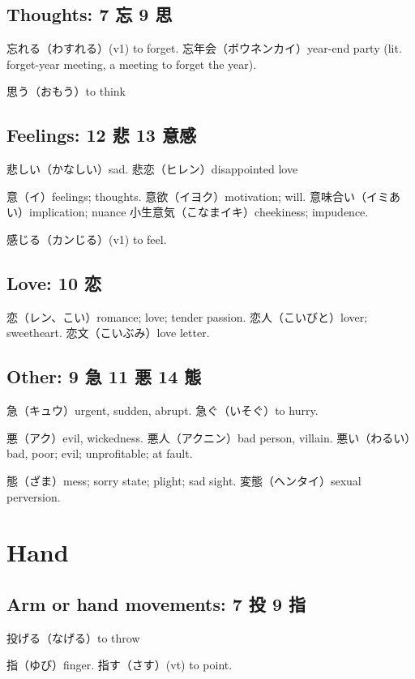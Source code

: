 \subsection{Thoughts: 7 忘 9 思}

忘れる（わすれる）(v1) to forget.
忘年会（ボウネンカイ）year-end party
(lit. forget-year meeting, a meeting to forget the year).

思う（おもう）to think

\subsection{Feelings: 12 悲 13 意感}

悲しい（かなしい）sad.
悲恋（ヒレン）disappointed love

意（イ）feelings; thoughts.
意欲（イヨク）motivation; will.
意味合い（イミあい）implication; nuance
小生意気（こなまイキ）cheekiness; impudence.

感じる（カンじる）(v1) to feel.

\subsection{Love: 10 恋}

恋（レン、こい）romance; love; tender passion.
恋人（こいびと）lover; sweetheart.
恋文（こいぶみ）love letter.

\subsection{Other: 9 急 11 悪 14 態}

急（キュウ）urgent, sudden, abrupt.
急ぐ（いそぐ）to hurry.

悪（アク）evil, wickedness.
悪人（アクニン）bad person, villain.
悪い（わるい）bad, poor; evil; unprofitable; at fault.

態（ざま）mess; sorry state; plight; sad sight.
変態（ヘンタイ）sexual perversion.

\section{Hand}

\subsection{Arm or hand movements: 7 投 9 指}

投げる（なげる）to throw

指（ゆび）finger.
指す（さす）(vt) to point.

